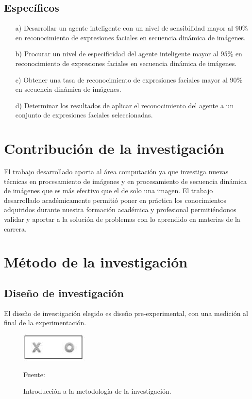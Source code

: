 \subsection{Específicos}
\begin{enumerate}
\item[a)] Desarrollar un agente inteligente con un nivel de sensibilidad mayor al 90\% en reconocimiento de expresiones faciales en secuencia dinámica de imágenes.

\item[b)] Procurar  un nivel de especificidad del agente inteligente mayor al 95\% en reconocimiento de expresiones faciales en secuencia dinámica de imágenes.

\item[c)] Obtener una tasa de reconocimiento de expresiones faciales mayor al 90\% en secuencia dinámica de imágenes.

\item[d)] Determinar los resultados de aplicar el reconocimiento del agente a un conjunto de expresiones faciales seleccionadas.
\end{enumerate}

\section{Contribución de la investigación}

El trabajo desarrollado aporta al área computación ya que investiga nuevas técnicas en procesamiento de imágenes y en procesamiento de secuencia dinámica de imágenes que es más efectivo que el de solo una imagen. 
\vskip 0.3cm
El trabajo desarrollado académicamente permitió poner en práctica los conocimientos adquiridos durante nuestra formación académica y profesional permitiéndonos validar y aportar a la solución de problemas con lo aprendido en materias de la carrera.

\section{Método de la investigación}

\subsection{Diseño de investigación}
El diseño de investigación elegido es diseño pre-experimental, con una medición al final de la experimentación.

\begin{figure}[ht]
\begin{center}
\includegraphics[width=0.3\textwidth]{Imagen1}
\end{center}
\begin{center}
\vskip -0.5cm
\caption{\small{Introducción a la metodología de la investigación.}}
{\small{Fuente: \cite{bernalMetodologia}}}
\end{center}
\end{figure}

